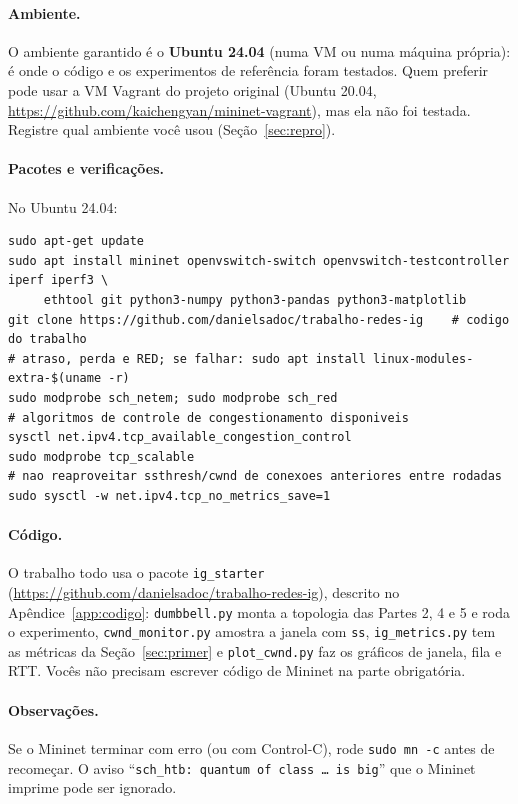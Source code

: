 \documentclass[11pt,a4paper]{article}
\begin{document}
\paragraph{Ambiente.} O ambiente garantido é o \textbf{Ubuntu 24.04} (numa VM ou numa
máquina própria): é onde o código e os experimentos de referência foram testados. Quem
preferir pode usar a VM Vagrant do projeto original (Ubuntu 20.04,
\url{https://github.com/kaichengyan/mininet-vagrant}), mas ela não foi testada. Registre
qual ambiente você usou (Seção~\ref{sec:repro}).

\paragraph{Pacotes e verificações.} No Ubuntu 24.04:
\begin{lstlisting}[style=sh]
sudo apt-get update
sudo apt install mininet openvswitch-switch openvswitch-testcontroller iperf iperf3 \
     ethtool git python3-numpy python3-pandas python3-matplotlib
git clone https://github.com/danielsadoc/trabalho-redes-ig    # codigo do trabalho
# atraso, perda e RED; se falhar: sudo apt install linux-modules-extra-$(uname -r)
sudo modprobe sch_netem; sudo modprobe sch_red
# algoritmos de controle de congestionamento disponiveis
sysctl net.ipv4.tcp_available_congestion_control
sudo modprobe tcp_scalable
# nao reaproveitar ssthresh/cwnd de conexoes anteriores entre rodadas
sudo sysctl -w net.ipv4.tcp_no_metrics_save=1
\end{lstlisting}
\paragraph{Código.} O trabalho todo usa o pacote \texttt{ig\_starter}
(\url{https://github.com/danielsadoc/trabalho-redes-ig}), descrito no Apêndice~\ref{app:codigo}:
\texttt{dumbbell.py} monta a topologia das Partes 2, 4 e 5 e roda o experimento,
\texttt{cwnd\_monitor.py} amostra a janela com \texttt{ss}, \texttt{ig\_metrics.py} tem as
métricas da Seção~\ref{sec:primer} e \texttt{plot\_cwnd.py} faz os gráficos de janela,
fila e RTT. Vocês não precisam escrever código de Mininet na parte obrigatória.

\paragraph{Observações.} Se o Mininet terminar com erro (ou com Control-C), rode
\texttt{sudo mn -c} antes de recomeçar. O aviso
“\texttt{sch\_htb: quantum of class \dots\ is big}” que o Mininet imprime pode ser ignorado.
\end{document}
